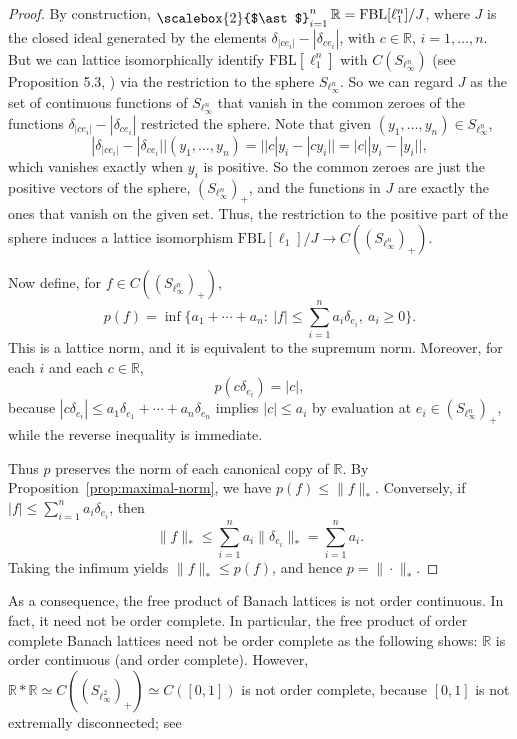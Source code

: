 \documentclass[12pt]{amsart}
\newcommand{\FBL}{\mathrm{FBL}}
\DeclareMathOperator*{\bigfree}{\raisebox{-0.6ex}{\scalebox{2}{$\ast$}}}
\theoremstyle{plain}
\theoremstyle{definition}
\begin{document}
\begin{proof}
By construction, $\bigfree_{i=1}^n\mathbb{R}=\FBL[\ell_1^n]/J$, where $J$ is the closed ideal generated by the elements $\delta_{|ce_i|}-|\delta_{ce_i}|$, with $c\in \mathbb R$, $i=1,\ldots,n$. But we can lattice isomorphically identify $\FBL[\ell_1^n]$ with $C(S_{\ell_\infty^n})$ (see Proposition 5.3, \cite{projfree}) via the restriction to the sphere $S_{\ell_{\infty}^n}$. So we can regard $J$ as the set of continuous functions of $S_{\ell_\infty^n}$ that vanish in the common zeroes of the functions $\delta_{|ce_i|}-|\delta_{ce_i}|$ restricted the sphere. Note that given $(y_1,\ldots,y_n)\in S_{\ell_\infty^n}$, 
\[
|\delta_{|ce_i|}-|\delta_{ce_i}||(y_1,\ldots,y_n)=||c|y_i-|cy_i||=|c||y_i-|y_i||,
\]
which vanishes exactly when $y_i$ is positive. So the common zeroes are just the positive vectors of the sphere, $(S_{\ell_\infty^n})_+$, and the functions in $J$ are exactly the ones that vanish on the given set. Thus, the restriction to the positive part of the sphere induces a lattice isomorphism $\FBL[\ell_1]/J\longrightarrow C((S_{\ell_\infty^n})_+)$.

Now define, for $f\in C((S_{\ell_\infty^n})_+)$,
\[
p(f)=\inf\Big\{a_1+\cdots+a_n:\ |f|\leq \sum_{i=1}^n a_i \delta_{e_i},\ a_i\geq 0\Big\}.
\]
This is a lattice norm, and it is equivalent to the supremum norm. Moreover, for each $i$ and each $c\in \mathbb{R}$,
\[
p(c\delta_{e_i})=|c|,
\]
because $|c\delta_{e_i}|\leq a_1\delta_{e_1}+\cdots+a_n\delta_{e_n}$ implies $|c|\leq a_i$ by evaluation at $e_i\in (S_{\ell_\infty^n})_+$, while the reverse inequality is immediate.

Thus $p$ preserves the norm of each canonical copy of $\mathbb{R}$. By Proposition~\ref{prop:maximal-norm}, we have $p(f)\leq \|f\|_{\ast}$. Conversely, if $|f|\leq \sum_{i=1}^n a_i \delta_{e_i}$, then
\[
\|f\|_{\ast}\leq \sum_{i=1}^n a_i\|\delta_{e_i}\|_{\ast}=\sum_{i=1}^n a_i.
\]
Taking the infimum yields $\|f\|_{\ast}\leq p(f)$, and hence $p=\|\cdot\|_{\ast}$.
\end{proof}

As a consequence, the free product of Banach lattices is not order continuous. In fact, it need not be order complete. In particular, the free product of order complete Banach lattices need not be order complete as the following shows: $\mathbb{R}$ is order continuous (and order complete). However, $\mathbb{R}*\mathbb{R}\simeq C((S_{\ell_\infty^2})_+)\simeq C([0,1])$ is not order complete, because $[0,1]$ is not extremally disconnected; see \cite[Proposition 1.a.4]{LT2} 
\end{document}
